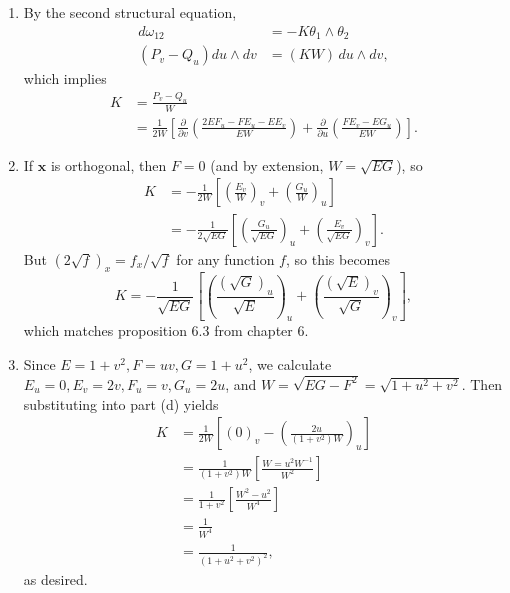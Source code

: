 \documentclass[10pt]{report}
\begin{document}
\begin{enumerate}
	\item By the second structural equation,
		\begin{align*}
			d\omega_{12} &= -K\theta_1 \wedge \theta_2 \\
			(P_{v}-Q_{u})du \wedge dv &= (KW)\,du \wedge dv,
		\end{align*}
		which implies
		\begin{align*}
			K &= \frac{P_{v}-Q_{u}}{W} \\
			  &= \frac{1}{2W} \left[ \frac{\partial }{\partial v} \left( \frac{2EF_{u}-FE_{u}-EE_{v}}{EW}  \right)+\frac{\partial }{\partial u} \left( \frac{FE_{v}-EG_{u}}{EW} \right) \right].
		\end{align*}

	\item If $\mathbf{x}$ is orthogonal, then $F=0$ (and by extension, $W = \sqrt{EG} $), so
		\begin{align*}
			K &= -\frac{1}{2W} \left[ \left( \frac{E_{v}}{W}  \right)_{v} + \left( \frac{G_{u}}{W}  \right)_{u} \right] \\
			  &= -\frac{1}{2\sqrt{EG} } \left[ \left( \frac{G_{u}}{\sqrt{EG} }  \right)_{u} + \left( \frac{E_{v}}{\sqrt{EG} }  \right)_{v} \right].
		\end{align*}
		But $(2\sqrt{f} )_{x} = f_{x}/\sqrt{f} $ for any function $f$, so this becomes
		\[
			K = -\frac{1}{\sqrt{EG} } \left[ \left( \frac{(\sqrt{G} )_{u}}{\sqrt{E} }  \right)_{u} + \left( \frac{(\sqrt{E} )_{v}}{\sqrt{G} }  \right)_{v} \right],
		\] which matches proposition 6.3 from chapter 6.

	\item Since $E=1+v^2,F=uv,G=1+u^2$, we calculate $E_{u}=0,E_{v}=2v,F_{u}=v, G_{u}=2u$, and $W = \sqrt{EG-F^2} =\sqrt{1+u^2+v^2} $. Then substituting into part (d) yields
		\begin{align*}
			K &= \frac{1}{2W} \left[ (0)_{v} - \left( \frac{2u}{(1+v^2)W}  \right)_{u}  \right] \\
			  &= \frac{1}{(1+v^2)W} \left[ \frac{W=u^2W^{-1}}{W^2}  \right] \\
			  &= \frac{1}{1+v^2} \left[ \frac{W^2-u^2}{W^4}  \right] \\
			  &= \frac{1}{W^4} \\
			  &= \frac{1}{(1+u^2+v^2)^2},
		\end{align*}
		as desired.
\end{enumerate}
\end{document}
